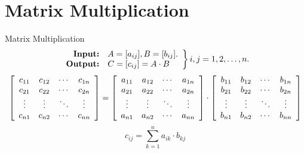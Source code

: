 \documentclass{beamer}
\begin{document}
\section{Matrix Multiplication}

\begin{frame}{Matrix Multiplication}
    $$
        \left.
            \begin{array}{r l}
                \text{\textbf{Input:}} & A=[a_{ij}], B=[b_{ij}] \text{.} \\
                \text{\textbf{Output:}} & C=[c_{ij}]=A \cdot B
            \end{array}
        \right\} i, j = 1, 2, \ldots, n\text{.}
    $$
    \pause
    \centering
    \footnotesize
    \begin{equation*}
        \left[
            \begin{array}{c c c c}
                c_{11} & c_{12} & \cdots & c_{1n} \\
                c_{21} & c_{22} & \cdots & c_{2n} \\
                \vdots & \vdots & \ddots & \vdots \\
                c_{n1} & c_{n2} & \cdots & c_{nn} \\
            \end{array}
        \right]
        =
        \left[
            \begin{array}{c c c c}
                a_{11} & a_{12} & \cdots & a_{1n} \\
                a_{21} & a_{22} & \cdots & a_{2n} \\
                \vdots & \vdots & \ddots & \vdots \\
                a_{n1} & a_{n2} & \cdots & a_{nn} \\
            \end{array}
        \right]
        \cdot
        \left[
            \begin{array}{c c c c}
                b_{11} & b_{12} & \cdots & b_{1n} \\
                b_{21} & b_{22} & \cdots & b_{2n} \\
                \vdots & \vdots & \ddots & \vdots \\
                b_{n1} & b_{n2} & \cdots & b_{nn} \\
            \end{array}
        \right]
    \end{equation*}
    \pause
    \Large
    \begin{equation*}
        c_{ij} = \sum_{k=1}^{n} a_{ik} \cdot b_{kj}
    \end{equation*}
\end{frame}
\end{document}
